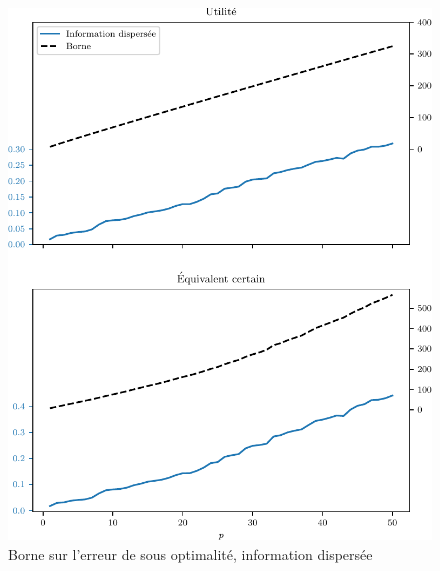 \begin{figure}[h]
  \centering
  \includegraphics[width=\textwidth]{../../experiments/fig/pconst_so_disp.pdf}
  \caption[Borne sur l'erreur de S.O. II]{Borne sur l'erreur de sous optimalité,
    information dispersée}
  \label{fig_pconst_so_disp}
\end{figure}

